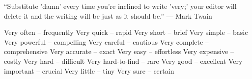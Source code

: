 

“Substitute 'damn' every time you're inclined to write 'very;' your editor will delete it and the writing will be just as it should be.” ― Mark Twain

Very often – frequently
Very quick – rapid
Very short – brief
Very simple – basic
Very powerful – compelling
Very careful – cautious
Very complete – comprehensive
Very accurate – exact
Very easy – effortless
Very expensive – costly
Very hard – difficult
Very hard-to-find – rare
Very good – excellent
Very important – crucial
Very little – tiny
Very sure – certain